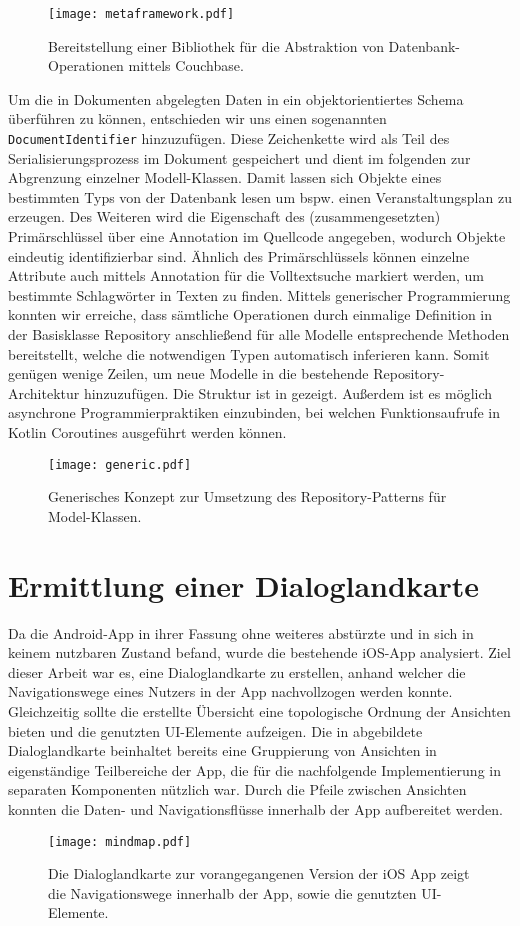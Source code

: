 \begin{figure}[H]
    \texttt{[image: metaframework.pdf]}
    \vspace{-25mm}
    \caption{Bereitstellung einer Bibliothek für die Abstraktion von Datenbank-Operationen mittels Couchbase.}\label{fig:metaframework}
\end{figure}


Um die in Dokumenten abgelegten Daten in ein objektorientiertes Schema überführen zu können, entschieden wir uns einen sogenannten
\texttt{DocumentIdentifier} hinzuzufügen. Diese Zeichenkette wird als Teil des Serialisierungsprozess im Dokument gespeichert und dient im folgenden zur Abgrenzung einzelner Modell-Klassen. Damit lassen sich Objekte eines bestimmten Typs von der Datenbank lesen um bspw. einen Veranstaltungsplan zu erzeugen. Des Weiteren wird die Eigenschaft des (zusammengesetzten) Primärschlüssel über eine Annotation im Quellcode angegeben, wodurch Objekte eindeutig identifizierbar sind. Ähnlich des Primärschlüssels können einzelne Attribute auch mittels Annotation für die Volltextsuche markiert werden, um bestimmte Schlagwörter in Texten zu finden. Mittels generischer Programmierung konnten wir erreiche, dass sämtliche Operationen durch einmalige Definition in der Basisklasse Repository anschließend für alle Modelle entsprechende Methoden bereitstellt, welche die notwendigen Typen automatisch inferieren kann. Somit genügen wenige Zeilen, um neue Modelle in die bestehende Repository-Architektur hinzuzufügen. Die Struktur ist in  gezeigt. Außerdem ist es möglich asynchrone Programmierpraktiken einzubinden, bei welchen Funktionsaufrufe in Kotlin Coroutines ausgeführt werden können.

\begin{figure}[H]
    \texttt{[image: generic.pdf]}
    \caption{Generisches Konzept zur Umsetzung des Repository-Patterns für Model-Klassen.}\label{fig:generic}
\end{figure}

\section{Ermittlung einer Dialoglandkarte}

Da die Android-App in ihrer Fassung ohne weiteres abstürzte und in sich in keinem nutzbaren Zustand befand, wurde die bestehende iOS-App analysiert. Ziel dieser Arbeit war es, eine Dialoglandkarte zu erstellen, anhand welcher die Navigationswege eines Nutzers in der App nachvollzogen werden konnte. Gleichzeitig sollte die erstellte Übersicht eine topologische Ordnung der Ansichten bieten und die genutzten UI-Elemente aufzeigen. Die in  abgebildete Dialoglandkarte beinhaltet bereits eine Gruppierung von Ansichten in eigenständige Teilbereiche der App, die für die nachfolgende Implementierung in separaten Komponenten nützlich war. Durch die Pfeile zwischen Ansichten konnten die Daten- und Navigationsflüsse innerhalb der App aufbereitet werden. 

\begin{figure}[H]
    \texttt{[image: mindmap.pdf]}
    \caption{Die Dialoglandkarte zur vorangegangenen Version der iOS App zeigt die Navigationswege innerhalb der App, sowie die genutzten UI-Elemente.}\label{fig:mindmap}
\end{figure}


